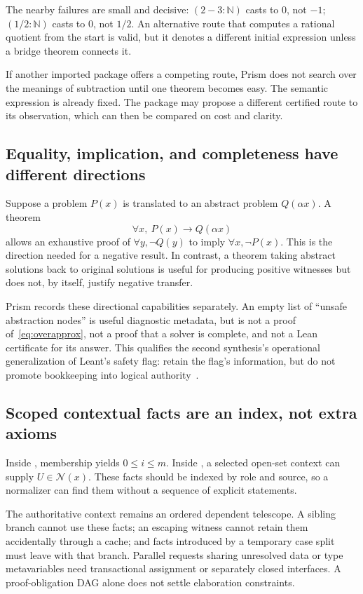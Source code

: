 \documentclass[11pt,a4paper]{article}
\newcommand{\code}[1]{\texttt{\detokenize{#1}}}
\newcommand{\N}{\mathbb N}
\theoremstyle{definition}
\theoremstyle{remark}
\begin{document}
The nearby failures are small and decisive: $(2-3:\N)$ casts to $0$, not $-1$; $(1/2:\N)$ casts to $0$, not $1/2$. An alternative route that computes a rational quotient from the start is valid, but it denotes a different initial expression unless a bridge theorem connects it.

If another imported package offers a competing route, Prism does not search over the meanings of subtraction until one theorem becomes easy. The semantic expression is already fixed. The package may propose a different certified route to its observation, which can then be compared on cost and clarity.

\subsection{Equality, implication, and completeness have different directions}
Suppose a problem $P(x)$ is translated to an abstract problem $Q(\alpha x)$. A theorem
\begin{equation}\label{eq:overapprox}
\forall x,\ P(x)\to Q(\alpha x)
\end{equation}
allows an exhaustive proof of $\forall y,\neg Q(y)$ to imply $\forall x,\neg P(x)$. This is the direction needed for a negative result. In contrast, a theorem taking abstract solutions back to original solutions is useful for producing positive witnesses but does not, by itself, justify negative transfer.

Prism records these directional capabilities separately. An empty list of ``unsafe abstraction nodes'' is useful diagnostic metadata, but is not a proof of~\eqref{eq:overapprox}, not a proof that a solver is complete, and not a Lean certificate for its answer. This qualifies the second synthesis's operational generalization of Leant's safety flag: retain the flag's information, but do not promote bookkeeping into logical authority~\cite{synB,engine}.

\subsection{Scoped contextual facts are an index, not extra axioms}
Inside \code{sum i in [0..m]}, membership yields $0\le i\le m$. Inside \code{at x in U}, a selected open-set context can supply $U\in\mathcal N(x)$. These facts should be indexed by role and source, so a normalizer can find them without a sequence of explicit \code{have} statements.

The authoritative context remains an ordered dependent telescope. A sibling branch cannot use these facts; an escaping witness cannot retain them accidentally through a cache; and facts introduced by a temporary case split must leave with that branch. Parallel requests sharing unresolved data or type metavariables need transactional assignment or separately closed interfaces. A proof-obligation DAG alone does not settle elaboration constraints.
\end{document}
